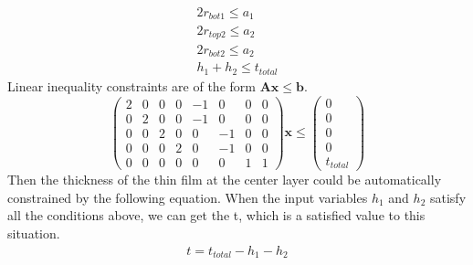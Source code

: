 \documentclass[12pt]{article}
\numberwithin{equation}{section}
\numberwithin{equation}{section}
\begin{document}
\begin{outline}[enumerate]
\begin{align*}
2r_{bot1} \leq a_1\\
2r_{top2} \leq a_2\\
2r_{bot2} \leq a_2 \\
h_1+h_2 \leq t_{total} 
\end{align*}
Linear inequality constraints are of the form $\mathbf{A} \mathbf{x} \leq \mathbf{b}$.
\setcounter{MaxMatrixCols}{20}
\begin{equation}
\left(
\begin{matrix}
2 & 0 & 0 & 0 & -1 & 0 &  0 & 0  \\
0 & 2 & 0 & 0 & -1 & 0 &  0 & 0 \\
0 & 0 & 2 & 0 & 0 & -1 & 0 & 0 \\
0 & 0 & 0 & 2 & 0 & -1 &  0 & 0  \\
0 & 0 & 0 & 0 & 0 & 0 &  1 & 1 
\end{matrix}
\right ) \mathbf{x}  \leq \left ( \begin{matrix} 0\\ 0\\ 0\\ 0 \\ t_{total} \end{matrix} \right ) 
\end{equation}
Then the thickness of the thin film at the center layer could be automatically constrained by the following equation. When the input variables $h_1$ and $h_2$ satisfy all the conditions above, we can get the t, which is a satisfied value to this situation. 
\begin{align}
\boxed {t = t_{total} - h_1 - h_2}
\end{align}
\end{outline}
\end{document}
